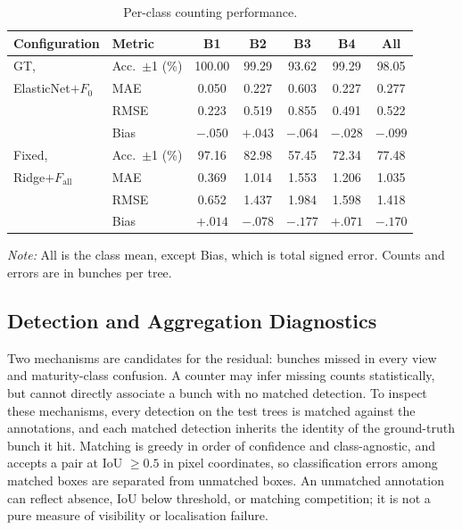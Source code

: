 \documentclass[conference,a4paper]{IEEEtran}
\begin{document}
\begin{table}[!tb]
  \centering
  \footnotesize
  \renewcommand{\arraystretch}{1.13}
  \setlength{\tabcolsep}{3pt}
  \caption{Per-class counting performance.}
  \label{tab:summary}
  \begin{tabular*}{\columnwidth}{@{\extracolsep{\fill}}llccccc@{}}
    \toprule
    Configuration & Metric & B1 & B2 & B3 & B4 & All \\
    \midrule
    GT,                     & Acc.\ $\pm$1 (\%) & 100.00  & 99.29   & 93.62   & 99.29   & 98.05 \\
    ElasticNet$+F_0$        & MAE             & 0.050   & 0.227   & 0.603   & 0.227   & 0.277 \\
                            & RMSE            & 0.223   & 0.519   & 0.855   & 0.491   & 0.522 \\
                            & Bias            & $-.050$ & $+.043$ & $-.064$ & $-.028$ & $-.099$ \\
    \addlinespace[2pt]
    Fixed,                  & Acc.\ $\pm$1 (\%) & 97.16   & 82.98   & 57.45   & 72.34   & 77.48 \\
    Ridge$+F_{\text{all}}$  & MAE             & 0.369   & 1.014   & 1.553   & 1.206   & 1.035 \\
                            & RMSE            & 0.652   & 1.437   & 1.984   & 1.598   & 1.418 \\
                            & Bias            & $+.014$ & $-.078$ & $-.177$ & $+.071$ & $-.170$ \\
    \bottomrule
  \end{tabular*}
\par\vspace{3pt}
  \begin{minipage}{\columnwidth}
    \footnotesize\raggedright
    \textit{Note:} All is the class mean, except Bias, which is total signed error. Counts and errors are in bunches per tree.
  \end{minipage}
\end{table}

\subsection{Detection and Aggregation Diagnostics}
\label{sec:attrib}
Two mechanisms are candidates for the residual: bunches missed in every view
and maturity-class confusion. A counter may infer missing counts statistically,
but cannot directly associate a bunch with no matched detection. To inspect
these mechanisms, every detection on the test trees is matched against the
annotations, and each matched detection inherits the identity of the
ground-truth bunch it hit. Matching is greedy in order of confidence and
class-agnostic, and accepts a pair at IoU $\geq 0.5$ in pixel coordinates, so
classification errors among matched boxes are separated from unmatched boxes.
An unmatched annotation can reflect absence, IoU below threshold, or matching
competition; it is not a pure measure of visibility or localisation failure.
\end{document}
